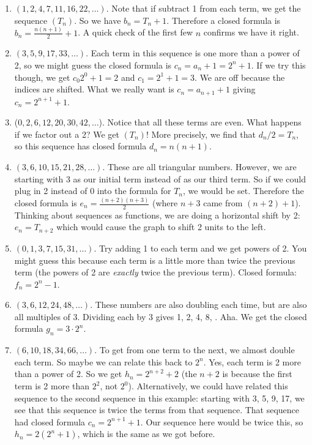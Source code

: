 \documentclass[11pt,]{book}
\theoremstyle{ptxplainnotitle}
\theoremstyle{ptxplaintitle}
\theoremstyle{ptxdefinitionnotitle}
\theoremstyle{ptxdefinitiontitle}
\theoremstyle{ptxdefinitionnotitle}
\theoremstyle{ptxdefinitiontitle}
\theoremstyle{ptxdefinitionnotitle}
\theoremstyle{ptxdefinitiontitle}
\theoremstyle{ptxdefinitiontitlenonumber}
\theoremstyle{ptxdefinitiontitlenonumber}
\numberwithin{equation}{chapter}
\begin{document}
\begin{example}
\begin{enumerate}
\item\hypertarget{li-42}{}\hypertarget{p-70}{}%
\((1, 2, 4, 7, 11, 16, 22, \ldots)\). Note that if subtract 1 from each term, we get the sequence \((T_n)\). So we have \(b_n = T_n + 1\). Therefore a closed formula is \(b_n = \frac{n(n+1)}{2} + 1\). A quick check of the first few \(n\) confirms we have it right.%
\item\hypertarget{li-43}{}\hypertarget{p-71}{}%
\((3, 5, 9, 17, 33, \ldots )\). Each term in this sequence is one more than a power of 2, so we might guess the closed formula is \(c_n = a_n+1 = 2^n + 1\). If we try this though, we get \(c_0 2^0 + 1 = 2\) and \(c_1 = 2^1 + 1 = 3\). We are off because the indices are shifted.  What we really want is \(c_n = a_{n+1}+1\) giving  \(c_n = 2^{n+1} + 1\).%
\item\hypertarget{li-44}{}\hypertarget{p-72}{}%
(\(0, 2, 6, 12, 20, 30, 42,\ldots \)). Notice that all these terms are even. What happens if we factor out a 2? We get \((T_n)\)! More precisely, we find that \(d_n/2 = T_n\), so this sequence has closed formula \(d_n = n(n+1)\).%
\item\hypertarget{li-45}{}\hypertarget{p-73}{}%
\((3, 6, 10, 15, 21, 28, \ldots)\). These are all triangular numbers. However, we are starting with 3 as our initial term instead of as our third term. So if we could plug in 2 instead of 0 into the formula for \(T_n\), we would be set. Therefore the closed formula is \(e_n = \frac{(n+2)(n+3)}{2}\) (where \(n+3\) came from \((n+2)+1\)).  Thinking about sequences as functions, we are doing a horizontal shift by 2: \(e_n = T_{n+2}\) which would cause the graph to shift 2 units to the left.%
\item\hypertarget{li-46}{}\hypertarget{p-74}{}%
\((0, 1, 3, 7, 15, 31, \ldots )\). Try adding 1 to each term and we get powers of 2. You might guess this because each term is a little more than twice the previous term (the powers of 2 are \emph{exactly} twice the previous term). Closed formula: \(f_n = 2^{n} - 1\).%
\item\hypertarget{li-47}{}\hypertarget{p-75}{}%
\((3, 6, 12, 24, 48, \ldots )\). These numbers are also doubling each time, but are also all multiples of 3. Dividing each by 3   gives 1, 2, 4, 8, \textellipsis{}. Aha. We get the closed formula \(g_n = 3\cdot 2^{n}\).%
\item\hypertarget{li-48}{}\hypertarget{p-76}{}%
\((6, 10, 18, 34, 66, \ldots )\). To get from one term to the next, we almost double each term. So maybe we can relate this back to \(2^n\). Yes, each term is 2 more than a power of 2. So we get \(h_n = 2^{n+2} + 2\) (the \(n+2\) is because the first term is 2 more than \(2^2\), not \(2^0\)). Alternatively, we could have related this sequence to the second sequence in this example: starting with 3, 5, 9, 17, \textellipsis{} we see that this sequence is twice the terms from that sequence. That sequence had closed formula \(c_n = 2^{n+1} + 1\). Our sequence here would be twice this, so \(h_n = 2(2^n + 1)\), which is the same as we got before.%

\end{enumerate}
\end{example}
\end{document}
